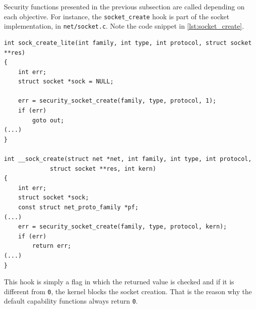 Security functions presented in the previous subsection are called depending on each objective. For instance, the \texttt{socket\_create} hook is part of the socket implementation, in \texttt{net/socket.c}. Note the code snippet in \autoref{lst:socket_create}.

\begin{lstlisting}[style=CInputStyle, caption=\texttt{socket\_create} hook in socket implementation (Linux kernel v3.11), label=lst:socket_create]
int sock_create_lite(int family, int type, int protocol, struct socket **res)
{
	int err;
	struct socket *sock = NULL;

	err = security_socket_create(family, type, protocol, 1);
	if (err)
		goto out;
(...)
}

int __sock_create(struct net *net, int family, int type, int protocol,
			 struct socket **res, int kern)
{
	int err;
	struct socket *sock;
	const struct net_proto_family *pf;
(...)
	err = security_socket_create(family, type, protocol, kern);
	if (err)
		return err;
(...)
}
\end{lstlisting}

This hook is simply a flag in which the returned value is checked and if it is different from \texttt{0}, the kernel blocks the socket creation. That is the reason why the default capability functions always return \texttt{0}.


